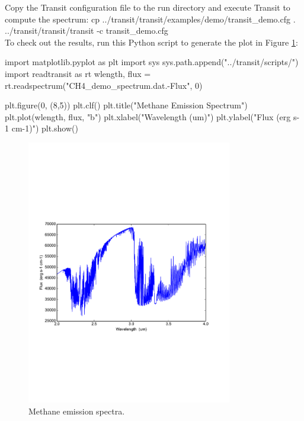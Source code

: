 \documentclass[letterpaper, 12pt]{article}
\begin{document}
\noindent Copy the Transit configuration file to the run
directory and execute Transit to compute the spectrum: \newline
{\tttb cp ../transit/transit/examples/demo/transit\_demo.cfg .} \\
{\tttb ../transit/transit/transit -c transit\_demo.cfg} \\

\noindent To check out the results, run this Python script to generate
the plot in Figure \ref{fig:demo}: \newline
\begin{python}
import matplotlib.pyplot as plt
import sys
sys.path.append("../transit/scripts/")
import readtransit as rt
wlength, flux = rt.readspectrum("CH4_demo_spectrum.dat.-Flux", 0)

plt.figure(0, (8,5))
plt.clf()
plt.title("Methane Emission Spectrum")
plt.plot(wlength, flux, "b")
plt.xlabel("Wavelength  (um)")
plt.ylabel("Flux  (erg s-1 cm-1)")
plt.show()
\end{python}

\begin{figure}[htb]
\centerline{
\includegraphics[width=0.8\textwidth, clip]{figs/Methane_emission_spectra.pdf}}
\caption{\small Methane emission spectra.}
\label{fig:demo}
\end{figure}
\end{document}
